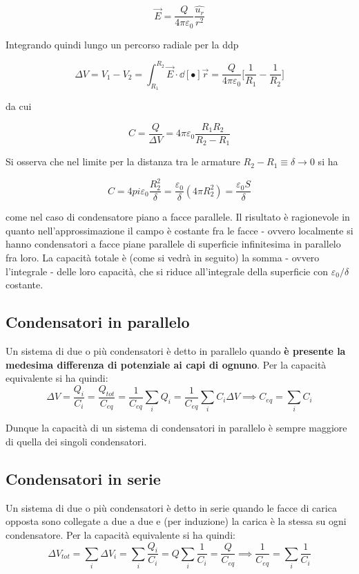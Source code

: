 \[\vec{E} = \frac{Q}{4 \pi \varepsilon_0} \frac{\hat{u_r}}{r^2}\]

Integrando quindi lungo un percorso radiale per la ddp

\[\Delta V = V_1 - V_2 = \int_{R_1}^{R_2} \vec{E} \cdot \dd[•]{\vec{r}} = \frac{Q}{4 \pi \varepsilon_0} \big[\frac{1}{R_1} - \frac{1}{R_2}\big]\]

da cui

\[C = \frac{Q}{\Delta V} = 4 \pi \varepsilon_0 \frac{R_1 R_2}{R_2 - R_1}\]

Si osserva che nel limite per la distanza tra le armature $R_2 - R_1 \equiv \delta \rightarrow 0$ si ha

\[C = 4 pi \varepsilon_0 \frac{R_2^2}{\delta} = \frac{\varepsilon_0}{\delta} (4 \pi R_2^2) = \frac{\varepsilon_0 S}{\delta}\]

come nel caso di condensatore piano a facce parallele. Il risultato è ragionevole in quanto nell'approssimazione il campo è costante fra le facce - ovvero localmente si hanno condensatori a facce piane parallele di superficie infinitesima in parallelo fra loro. La capacità totale è (come si vedrà in seguito) la somma - ovvero l'integrale - delle loro capacità, che si riduce all'integrale della superficie con $\varepsilon_0/\delta$ costante.



\subsection{Condensatori in parallelo}
Un sistema di due o più condensatori è detto in parallelo quando \textbf{è presente la medesima differenza di potenziale ai capi di ognuno}. Per la capacità equivalente si ha quindi:
\[\Delta V = \frac{Q_i}{C_i} = \frac{Q_{tot}}{C_{eq}} = \frac{1}{C_{eq}} \sum_i Q_i = \frac{1}{C_{eq}} \sum_i C_i \Delta V \implies C_{eq} = \sum_i C_i\]


Dunque la capacità di un sistema di condensatori in parallelo è sempre maggiore di quella dei singoli condensatori.

\subsection{Condensatori in serie}
Un sistema di due o più condensatori è detto in serie quando le facce di carica opposta sono collegate a due a due e (per induzione) la carica è la stessa su ogni condensatore. Per la capacità equivalente si ha quindi:
\[\Delta V_{tot} = \sum_i \Delta V_i = \sum_i \frac{Q_i}{C_i} = Q \sum_i \frac{1}{C_i} = \frac{Q}{C_{eq}} \implies \frac{1}{C_{eq}} = \sum_i \frac{1}{C_i}\]

